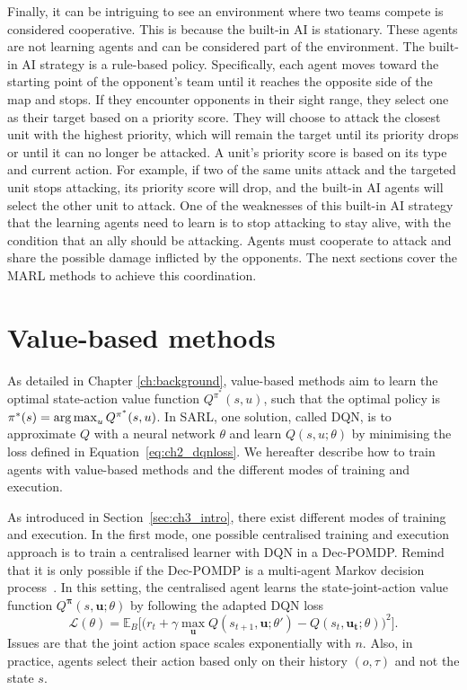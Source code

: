 Finally, it can be intriguing to see an environment where two teams compete is considered cooperative.
This is because the built-in AI is stationary. 
These agents are not learning agents and can be considered part of the environment.
The built-in AI strategy is a rule-based policy.
Specifically, each agent moves toward the starting point of the opponent's team until it reaches the opposite side of the map and stops.
If they encounter opponents in their sight range, they select one as their target based on a priority score.
They will choose to attack the closest unit with the highest priority, which will remain the target until its priority drops or until it can no longer be attacked.
A unit's priority score is based on its type and current action.
For example, if two of the same units attack and the targeted unit stops attacking, its priority score will drop, and the built-in AI agents will select the other unit to attack.
One of the weaknesses of this built-in AI strategy that the learning agents need to learn is to stop attacking to stay alive, with the condition that an ally should be attacking.
Agents must cooperate to attack and share the possible damage inflicted by the opponents.
The next sections cover the MARL methods to achieve this coordination.

\section{Value-based methods}
\label{sec:ch3_value}

As detailed in Chapter \ref{ch:background}, value-based methods aim to learn the optimal state-action value function $Q^{\pi^*}(s, u)$, such that the optimal policy is $\pi^*(s)=\operatorname*{arg\,max}_{u} Q^{\pi^*}(s, u)$.
In SARL, one solution, called DQN, is to approximate $Q$ with a neural network $\theta$ and learn $Q(s, u;\theta)$
by minimising the loss defined in Equation~\ref{eq:ch2_dqnloss}.
We hereafter describe how to train agents with value-based methods and the different modes of training and execution.

As introduced in Section~\ref{sec:ch3_intro}, there exist different modes of training and execution.
In the first mode, one possible centralised training and execution approach is to train a centralised learner with DQN in a Dec-POMDP.
Remind that it is only possible if the Dec-POMDP is a multi-agent Markov decision process~\citep{boutilier1996planning}.
In this setting, the centralised agent learns the state-joint-action value function $Q^{\mathbf{\pi}}(s,\mathbf{u}; \theta)$ by following the adapted DQN loss
\begin{equation}
\label{eq:ch3_centralQloss}
    \mathcal{L}(\theta) = \mathbb{E}_{B} \big[\big(r_{t} + \gamma \max_{\mathbf{u}} Q(s_{t+1}, \mathbf{u}; \theta')- Q(s_{t}, \mathbf{\mathbf{u_t}}; \theta)\big)^{2}\big].
\end{equation}
Issues are that the joint action space scales exponentially with $n$.
Also, in practice, agents select their action based only on their history $(o, \tau)$ and not the state $s$.

